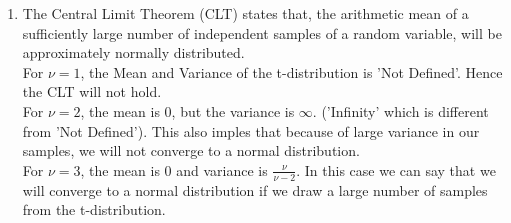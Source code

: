 \documentclass{article}
\begin{document}
\begin{enumerate}
\item The Central Limit Theorem (CLT) states that, the arithmetic mean of a sufficiently large number of independent samples of a random variable, will be approximately normally distributed. \\

For $\nu=1$, the Mean and Variance of the t-distribution is 'Not Defined'. Hence the CLT will not hold.\\

For $\nu=2$, the mean is 0, but the variance is $\infty.$ ('Infinity' which is different from 'Not Defined'). This also imples that because of large variance in our samples, we will not converge to a normal distribution.\\

For $\nu=3$, the mean is 0 and variance is $\frac{\nu}{\nu-2}$. In this case we can say that we will converge to a normal distribution if we draw a large number of samples from the t-distribution.\\

\end{enumerate}
\end{document}
